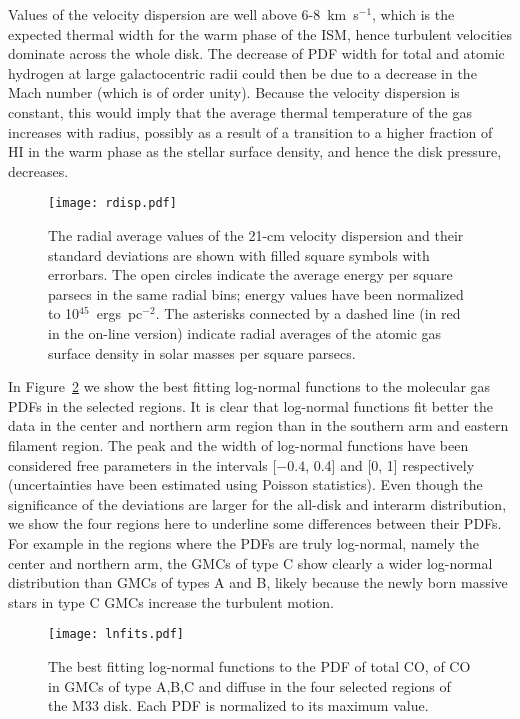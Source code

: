 \documentclass{aa}
\begin{document}
Values of the velocity dispersion are well above 6-8~km~s$^{-1}$,  which is the
expected thermal width for the warm phase of the ISM, hence turbulent velocities
dominate across the whole disk. The decrease of  PDF width for total and atomic
hydrogen at large galactocentric radii  could then be due to a decrease in the
Mach number (which is of order unity). 
Because the velocity dispersion is constant, this would imply that
the average thermal temperature of the gas increases with radius, possibly as a
result of a transition to a higher fraction of HI in the warm phase as the stellar
surface density, and hence the disk pressure, decreases.

\begin{figure}
\centering
\texttt{[image: rdisp.pdf]}
\caption{The radial average values of the 21-cm velocity dispersion and their standard deviations
are shown with filled square symbols with errorbars.
The open circles  indicate the average energy per square parsecs in the same radial bins; energy values have
been normalized to 10$^{45}$~ergs~pc$^{-2}$. The  asterisks connected by a dashed line (in red in the
on-line version) indicate radial averages of the atomic gas surface density in solar masses per square parsecs.
}
\label{kin}
\end{figure}

In Figure~\ref{fits} we show the best fitting log-normal functions to the molecular gas PDFs
in the selected regions. It is clear that log-normal functions fit better the data
in the center and northern arm region than in the southern arm and eastern
filament region. The peak  and the width  of log-normal functions have been
considered  free parameters in the intervals [$-0.4$, 0.4] and [0, 1] respectively  
(uncertainties have been estimated using Poisson statistics).
Even though the significance of the deviations are larger for the all-disk and
interarm distribution, we show the four regions here to underline some  
differences  between their PDFs.  For example in the regions where the PDFs  
are truly log-normal, namely   the center and northern arm,    
the GMCs of type C show clearly a wider log-normal distribution than  GMCs of types A and B,
likely because the newly born massive stars  in type C GMCs increase the turbulent
motion.


\begin{figure}
\centering
\texttt{[image: lnfits.pdf]}
\caption{The best fitting log-normal functions to the PDF of total CO, of CO in GMCs of type A,B,C and diffuse
in the four selected regions of the M33 disk. Each PDF is normalized to its maximum value.}
\label{fits}
\end{figure}
\end{document}
